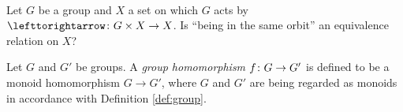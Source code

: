 \begin{exerciseRUS}~
\end{exerciseRUS}

\begin{exerciseENG}
Let $G$ be a group and $X$ a set on which $G$ acts by $\acts\taking G\times X\to X$. Is “being in the same orbit” an equivalence relation on $X$? 
\end{exerciseENG}

\begin{exerciseRUS}
\end{exerciseRUS}

\begin{definitionENG}\label{def:group homomorphism}
Let $G$ and $G'$ be groups. A {\em group homomorphism} $f\colon G\rightarrow G'$ is defined to be a monoid homomorphism $G\to G'$, where $G$ and $G'$ are being regarded as monoids in accordance with Definition \ref{def:group}.
\end{definitionENG}

\begin{definitionRUS}\label{def:group homomorphism}
\end{definitionRUS}
